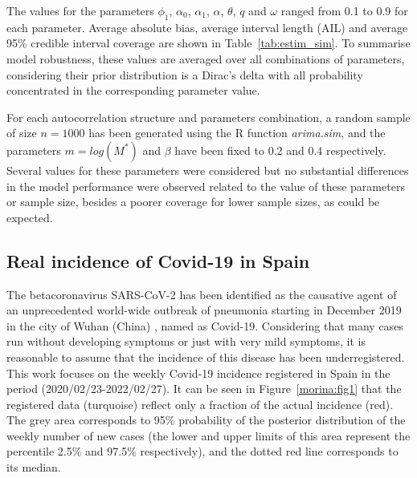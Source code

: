 \documentclass{bmcart}
\begin{document}
The values for the parameters $\phi_1$, $\alpha_0$, $\alpha_1$, $\alpha$, $\theta$, $q$ and $\omega$ ranged from 0.1 to 0.9 for each parameter. Average absolute bias, average interval length (AIL) and average 95\% credible interval coverage are shown in Table~\ref{tab:estim_sim}. To summarise model robustness, these values are averaged over all combinations of parameters, considering their prior distribution is a Dirac's delta with all probability concentrated in the corresponding parameter value. 

For each autocorrelation structure and parameters combination, a random sample of size $n = 1000$ has been generated using the R function \textit{arima.sim}, and the parameters $m=log(M^*)$ and $\beta$ have been fixed to $0.2$ and $0.4$ respectively. Several values for these parameters were considered but no substantial differences in the model performance were observed related to the value of these parameters or sample size, besides a poorer coverage for lower sample sizes, as could be expected.


\subsection*{Real incidence of Covid-19 in Spain}\label{covid}
The betacoronavirus SARS-CoV-2 has been identified as the causative agent of an unprecedented world-wide outbreak of pneumonia starting in December 2019 in the city of Wuhan (China) \cite{Sohrabi2020}, named as Covid-19. Considering that many cases run without developing symptoms or just with very mild symptoms, it is reasonable to assume that the incidence of this disease has been underregistered. This work focuses on the weekly Covid-19 incidence registered in Spain in the period (2020/02/23-2022/02/27). It can be seen in Figure~\ref{morina:fig1} that the registered data (turquoise) reflect only a fraction of the actual incidence (red). The grey area corresponds to 95\% probability of the posterior distribution of the weekly number of new cases (the lower and upper limits of this area represent the percentile 2.5\% and 97.5\% respectively), and the dotted red line corresponds to its median.

\end{document}
